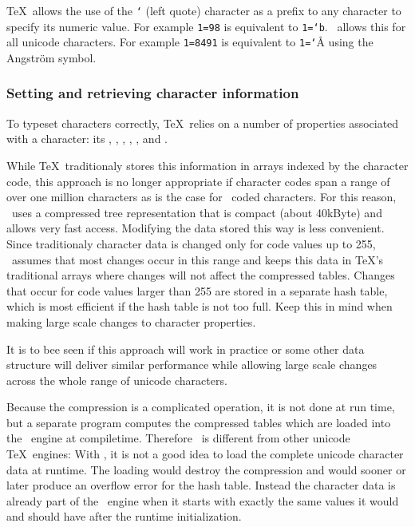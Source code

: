 \TeX\ allows the use of the  {\tt `} (left quote) character as a prefix to
any character to specify its numeric value. For example {\tt{}1=98}
is equivalent to {\tt{}1=`b}. \HiTeX\ allows this for all unicode characters.
For example  {\tt{}1=8491} is equivalent to  {\tt{}1=`}{\utf Å}
using the Angstr\"om symbol.




\subsubsection{Setting and retrieving character information}
To typeset characters correctly, \TeX\ relies on a number of properties
associated with a character: its
,  , , ,
, and .

While \TeX\ traditionaly stores this information in arrays indexed
by the character code, this approach is no longer appropriate if
character codes span a range of over one million characters as is the case for
\UTF\ coded characters. For this reason, \HiTeX\ uses a compressed
tree representation that is compact (about 40kByte) and allows very fast access.
Modifying the data stored this way is less convenient.
Since traditionaly character data is changed only for
code values up to  255, \HiTeX\ assumes that most changes
occur in this range and keeps this data in \TeX's
traditional arrays where changes will not affect the compressed tables.
Changes that occur for code values larger than 255 are stored in a separate
hash table, which is most efficient if the hash table is not too full. Keep this
in mind when making large scale changes to character properties.

It is to bee seen if this approach will work in practice or
some other data structure will deliver similar performance while
allowing large scale  changes across the whole range of unicode characters.

Because the compression is a complicated operation, it is not done at run time,
but a separate program computes the compressed tables which are loaded into
the \HiTeX\ engine at compiletime. Therefore \HiTeX\ is different from other
unicode \TeX\ engines: With \HiTeX, it is not a good idea
to load the complete unicode character data at runtime. The loading would destroy the
compression and would sooner or later produce an overflow error for the hash table.
Instead the character data is already part of the \HiTeX\ engine when it starts
with exactly the same values it would and should have after the runtime initialization.

